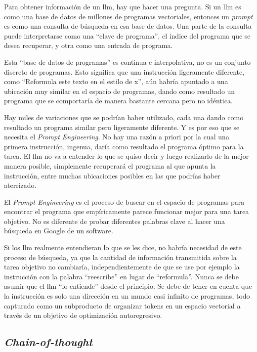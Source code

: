 Para obtener información de un \acrshort{llm}, hay que hacer una pregunta. Si un \acrshort{llm} es como una base de datos de millones de programas vectoriales, entonces un \textit{prompt} es como una consulta de búsqueda en esa base de datos. Una parte de la consulta puede interpretarse como una ``clave de programa'', el índice del programa que se desea recuperar, y otra como una entrada de programa.

Esta ``base de datos de programas'' es continua e interpolativa, no es un conjunto discreto de programas. Esto significa que una instrucción ligeramente diferente, como ``Reformula este texto en el estilo de x'', aún habría apuntado a una ubicación muy similar en el espacio de programas, dando como resultado un programa que se comportaría de manera bastante cercana pero no idéntica.

Hay miles de variaciones que se podrían haber utilizado, cada una dando como resultado un programa similar pero ligeramente diferente. Y es por eso que se necesita el \textit{Prompt Engineering}. No hay una razón a priori por la cual una primera instrucción, ingenua, daría como resultado el programa óptimo para la tarea. El \acrshort{llm} no va a entender lo que se quiso decir y luego realizarlo de la mejor manera posible, simplemente recuperará el programa al que apunta la instrucción, entre muchas ubicaciones posibles en las que podrías haber aterrizado.

El \textit{Prompt Engineering} es el proceso de buscar en el espacio de programas para encontrar el programa que empíricamente parece funcionar mejor para una tarea objetivo. No es diferente de probar diferentes palabras clave al hacer una búsqueda en Google de un software.

Si los \acrshort{llm} realmente entendieran lo que se les dice, no habría necesidad de este proceso de búsqueda, ya que la cantidad de información transmitida sobre la tarea objetivo no cambiaría, independientemente de que se use por ejemplo la instrucción con la palabra ``reescribe'' en lugar de ``reformula''. Nunca se debe asumir que el \acrshort{llm} ``lo entiende'' desde el principio. Se debe de tener en cuenta que la instrucción es solo una dirección en un mundo casi infinito de programas, todo capturado como un subproducto de organizar tokens en un espacio vectorial a través de un objetivo de optimización autoregresivo.

\subsection{\textit{Chain-of-thought}}

